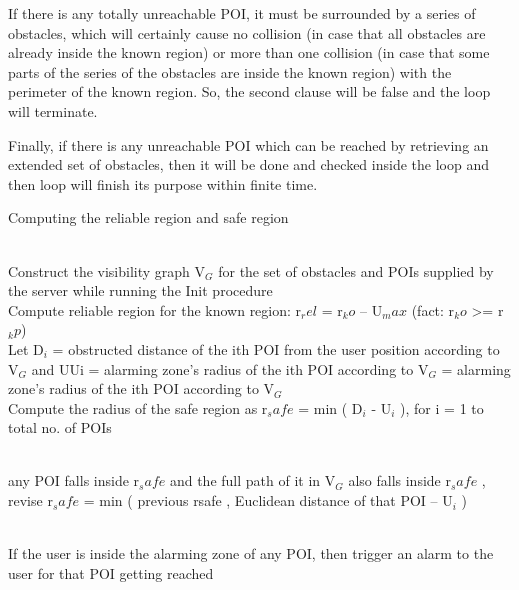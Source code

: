 \documentclass{sig-alternate}
\begin{document}
If there is any totally unreachable POI, it must be surrounded by a series of obstacles, which will certainly cause no collision (in case that all obstacles are already inside the known region) or more than one collision (in case that some parts of the series of the obstacles are inside the known region) with the perimeter of the known region. So, the second clause will be false and the loop will terminate.

Finally, if there is any unreachable POI which can be reached by retrieving an extended set of obstacles, then it will be done and checked inside the loop and then loop will finish its purpose within finite time.


\begin{algorithm}
\caption{Computing the reliable region and safe region}
\label{CRRSR}
\begin{algorithmic}[2]
\\Construct the visibility graph V$_G$ for the set of obstacles and POIs supplied by the server while running the Init procedure
\\Compute reliable region for the known region: r$_rel$ = r$_ko$ – U$_max$ (fact: r$_ko$ >= r$_kp$)
\\Let D$_i$ = obstructed distance of the ith POI from the user position according to V$_G$
and UUi = alarming zone’s radius of the ith POI according to V$_G$ = alarming zone’s radius of the ith POI according to V$_G$
\\Compute the radius of the safe region as r$_safe$  = min ( D$_i$  - U$_i$ ), for i = 1 to total no. of POIs

\\ \While any POI falls inside r$_safe$ and the full path of it in V$_G$ also falls inside r$_safe$ , 
\State revise r$_safe$ = min ( previous rsafe , Euclidean distance of that POI – U$_i$ )

\\If the user is inside the alarming zone of any POI, then trigger an alarm to the user for that POI getting reached


\EndProcedure
\end{algorithmic}
\end{algorithm}
\end{document}
